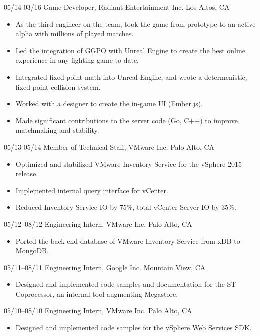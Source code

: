 \documentclass[]{zimine-cv}
\begin{document}
\begin{entrylist}
  \entry
    {05/14-03/16}
    {Game Developer, Radiant Entertainment Inc.}
    {Los Altos, CA}
    {\begin{itemize}
      \item As the third engineer on the  team, took the game from prototype to an active alpha with millions of played matches.
      \item Led the integration of GGPO with Unreal Engine to create the best online experience in any fighting game to date.
      \item Integrated fixed-point math into Unreal Engine, and wrote a determenistic, fixed-point collision system.
      \item Worked with a designer to create the in-game UI (Ember.js).
      \item Made significant contributions to the server code (Go, C++) to improve matchmaking and stability.
    \end{itemize}}
  \entry
    {05/13-05/14}
    {Member of Technical Staff, VMware Inc.}
    {Palo Alto, CA}
    {\begin{itemize}
      \item Optimized and stabilized VMware Inventory Service for the vSphere 2015 release.
      \item Implemented internal query interface for vCenter.
      \item Reduced Inventory Service IO by 75\%, total vCenter Server IO by 35\%.
    \end{itemize}}
  \entry
    {05/12–08/12}
    {Engineering Intern, VMware Inc.}
    {Palo Alto, CA}
    {\begin{itemize}
      \item Ported the back-end database of VMware Inventory Service from xDB to MongoDB.
    \end{itemize}}
  \entry
    {05/11–08/11}
    {Engineering Intern, Google Inc.}
    {Mountain View, CA}
    {\begin{itemize}
      \item Designed and implemented code samples and documentation for the ST Coprocessor, an internal tool augmenting Megastore.
    \end{itemize}}
  \entry
    {05/10–08/10}
    {Engineering Intern, VMware Inc.}
    {Palo Alto, CA}
    {\begin{itemize}
      \item Designed and implemented code samples for the vSphere Web Services SDK.
    \end{itemize}}
\end{entrylist}
\end{document}

